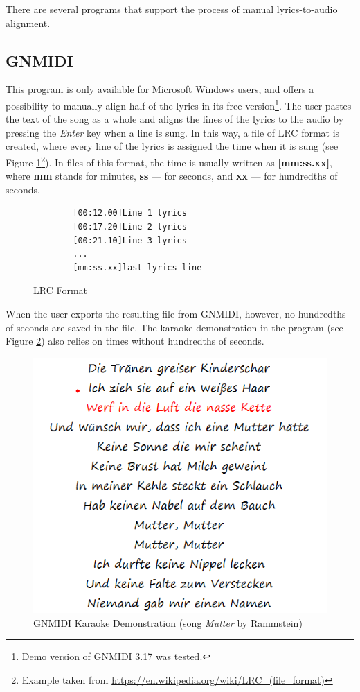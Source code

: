There are several programs that support the process of manual lyrics-to-audio alignment.

\subsection{GNMIDI}

This program is only available for Microsoft Windows users, and offers a possibility to manually align half of the lyrics in its free version\footnote{Demo version of GNMIDI 3.17 was tested.}. The user pastes the text of the song as a whole and aligns the lines of the lyrics to the audio by pressing the \textit{Enter} key when a line is sung. In this way, a file of LRC format is created, where every line of the lyrics is assigned the time when it is sung (see Figure \ref{fig:lrcFormat}\footnote{Example taken from \url{https://en.wikipedia.org/wiki/LRC_(file_format)}}). In files of this format, the time is usually written as \textbf{[mm:ss.xx]}, where \textbf{mm} stands for minutes, \textbf{ss} --- for seconds, and \textbf{xx} --- for hundredths of seconds. 

\begin{figure}[H]
    \begin{verbatim} 
        [00:12.00]Line 1 lyrics
        [00:17.20]Line 2 lyrics
        [00:21.10]Line 3 lyrics
        ...
        [mm:ss.xx]last lyrics line  \end{verbatim}
    \caption{LRC Format}
    \label{fig:lrcFormat}
\end{figure}

When the user exports the resulting file from GNMIDI, however, no hundredths of seconds are saved in the file. The karaoke demonstration in the program (see Figure \ref{fig:karaokeDemo}) also relies on times without hundredths of seconds. 

\begin{figure}[H]
    \centering
    \includegraphics{images/gnmidiScreenshot.png}
    \caption{GNMIDI Karaoke Demonstration (song \textit{Mutter} by Rammstein)}
    \label{fig:karaokeDemo}
\end{figure}

